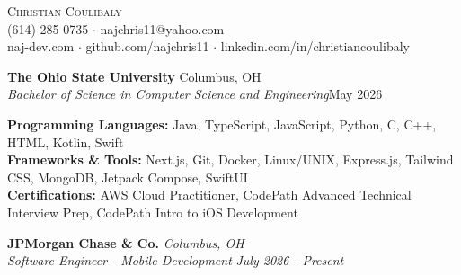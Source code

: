 \documentclass[letterpaper]{article}
\begin{document}
\vspace*{-40pt}

\vspace*{-10pt}
\begin{center}
	{\Huge \scshape {Christian Coulibaly}}\\
	(614) 285 0735 $\cdot$ najchris11@yahoo.com \\
    naj-dev.com $\cdot$ github.com/najchris11 $\cdot$ linkedin.com/in/christiancoulibaly\\
\end{center}

\vspace{1mm}

    \textbf{The Ohio State University} \hfill Columbus, OH\\
    \textit{Bachelor of Science in Computer Science and Engineering}\hfill May 2026\\
    \vspace{2mm}


\vspace{1mm}

    \textbf{Programming Languages:} Java, TypeScript, JavaScript, Python, C, C++, HTML, Kotlin, Swift \\
    \textbf{Frameworks \& Tools:} Next.js, Git, Docker, Linux/UNIX, Express.js, Tailwind CSS, MongoDB, Jetpack Compose, SwiftUI \\
    \textbf{Certifications:} AWS Cloud Practitioner, CodePath Advanced Technical Interview Prep, CodePath Intro to iOS Development \\
\vspace{2mm}

\vspace{1mm}

    \textbf{JPMorgan Chase \& Co.} \hfill \textsl{Columbus, OH}\\

    \textit{Software Engineer - Mobile Development} \hfill \textsl{July 2026 - Present}\\
    \vspace{1mm}
\end{document}
